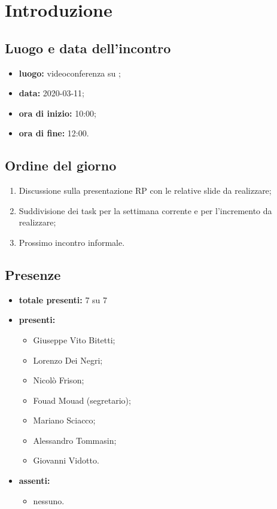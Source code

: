 \section*{Introduzione}

\subsection*{Luogo e data dell'incontro}
	\begin{itemize}
		\item \textbf{luogo:} videoconferenza su ;
		\item \textbf{data:} 2020-03-11;
		\item \textbf{ora di inizio:} 10:00;
		\item \textbf{ora di fine:} 12:00.
	\end{itemize}

\subsection*{Ordine del giorno}
	\begin{enumerate}
			\item Discussione sulla presentazione RP con le relative slide da realizzare;
			\item Suddivisione dei task per la settimana corrente e per l'incremento da realizzare;
			\item Prossimo incontro informale.
	\end{enumerate}

\subsection*{Presenze}
	\begin{itemize}
		\item \textbf{totale presenti:} 7 su 7
		\item \textbf{presenti: }
			\begin{itemize}
				\item Giuseppe Vito Bitetti;
				\item Lorenzo Dei Negri;
				\item Nicolò Frison;
				\item Fouad Mouad (segretario);
				\item Mariano Sciacco;
				\item Alessandro Tommasin;
				\item Giovanni Vidotto.
			\end{itemize}
		\item \textbf{assenti: }
			\begin{itemize}
				\item nessuno.
			\end{itemize}
	\end{itemize}


